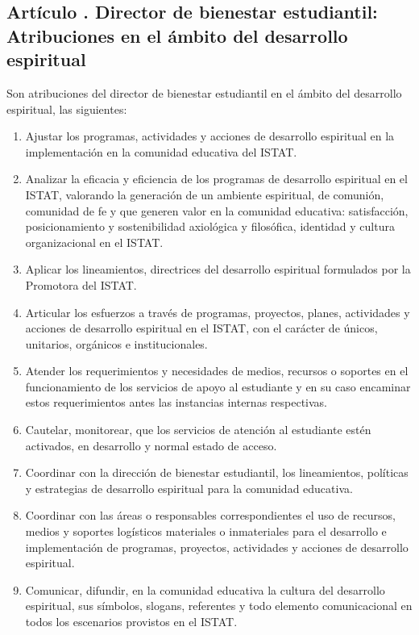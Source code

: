 \subsection{Artículo . Director de bienestar estudiantil: Atribuciones en el ámbito del desarrollo espiritual}
\addtocounter{ns}{1}
Son atribuciones del director de bienestar estudiantil en el ámbito del desarrollo espiritual, las siguientes: 
\begin{enumerate}

\item Ajustar los programas, actividades y acciones de desarrollo espiritual en la implementación en la comunidad educativa del ISTAT. 
\item Analizar la eficacia y eficiencia de los programas de desarrollo espiritual en el ISTAT, valorando la generación de un ambiente espiritual, de comunión, comunidad de fe y que generen valor en la comunidad educativa: satisfacción, posicionamiento y sostenibilidad axiológica y filosófica, identidad y cultura organizacional en el ISTAT. 
\item Aplicar los lineamientos, directrices del desarrollo espiritual formulados por la Promotora del ISTAT. 
\item Articular los esfuerzos a través de programas, proyectos, planes, actividades y acciones de desarrollo espiritual en el ISTAT, con el carácter de únicos, unitarios, orgánicos e institucionales. 
\item Atender los requerimientos y necesidades de medios, recursos o soportes en el funcionamiento de los servicios de apoyo al estudiante y en su caso encaminar estos requerimientos antes las instancias internas respectivas. 
\item Cautelar, monitorear, que los servicios de atención al estudiante estén activados, en desarrollo y normal estado de acceso.  
\item Coordinar con la dirección de bienestar estudiantil, los lineamientos, políticas y estrategias de desarrollo espiritual para la comunidad educativa.
\item Coordinar con	las áreas o responsables correspondientes el uso de recursos, medios y soportes logísticos materiales o inmateriales para el desarrollo e implementación de programas, proyectos, actividades y acciones de desarrollo espiritual. 
\item Comunicar, difundir, en la comunidad educativa la cultura del desarrollo espiritual, sus símbolos, slogans, referentes y todo elemento comunicacional en todos los escenarios provistos en el ISTAT. 

\end{enumerate}
